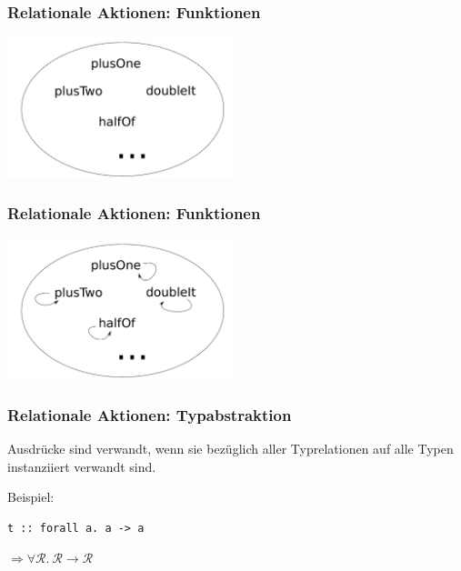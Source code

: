 \documentclass{beamer}
\begin{document}

\begin{frame}
\frametitle{Relationale Aktionen: Funktionen}

\begin{center}
\includegraphics[width=250px]{menge-onetofive-functions}
\end{center}
\end{frame}


\begin{frame}
\frametitle{Relationale Aktionen: Funktionen}

\begin{center}
\includegraphics[width=250px]{relation-onetofive-functions}
\end{center}
\end{frame}


\begin{frame}[fragile]
\frametitle{Relationale Aktionen: Typabstraktion}

Ausdrücke sind verwandt, wenn sie bezüglich aller Typrelationen auf alle Typen instanziiert verwandt sind.

\pause
\vspace{36px}

Beispiel:

\begin{verbatim}
t :: forall a. a -> a
\end{verbatim}

\pause

$\Rightarrow \forall \mathcal{R}.~ \mathcal{R} \rightarrow \mathcal{R}$
\end{frame}
\end{document}
